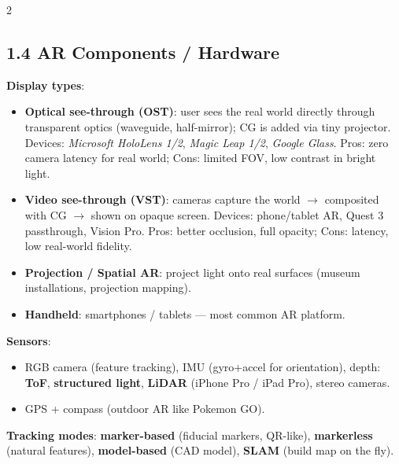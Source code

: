 \begin{paracol}{2}
\subsection*{1.4 AR Components / Hardware}
\textbf{Display types}:
\begin{itemize}[leftmargin=*,nosep]
  \item \textbf{Optical see-through (OST)}: user sees the real world directly through transparent optics (waveguide, half-mirror); CG is added via tiny projector. Devices: \emph{Microsoft HoloLens 1/2}, \emph{Magic Leap 1/2}, \emph{Google Glass}. Pros: zero camera latency for real world; Cons: limited FOV, low contrast in bright light.
  \item \textbf{Video see-through (VST)}: cameras capture the world $\to$ composited with CG $\to$ shown on opaque screen. Devices: phone/tablet AR, Quest 3 passthrough, Vision Pro. Pros: better occlusion, full opacity; Cons: latency, low real-world fidelity.
  \item \textbf{Projection / Spatial AR}: project light onto real surfaces (museum installations, projection mapping).
  \item \textbf{Handheld}: smartphones / tablets — most common AR platform.
\end{itemize}
\textbf{Sensors}:
\begin{itemize}[leftmargin=*,nosep]
  \item RGB camera (feature tracking), IMU (gyro+accel for orientation), depth: \textbf{ToF}, \textbf{structured light}, \textbf{LiDAR} (iPhone Pro / iPad Pro), stereo cameras.
  \item GPS + compass (outdoor AR like Pokemon GO).
\end{itemize}
\textbf{Tracking modes}: \textbf{marker-based} (fiducial markers, QR-like), \textbf{markerless} (natural features), \textbf{model-based} (CAD model), \textbf{SLAM} (build map on the fly).

\switchcolumn


\end{paracol}
